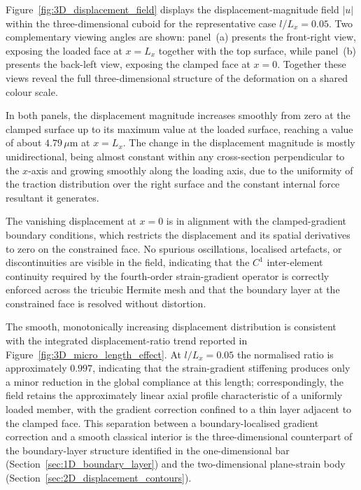 \documentclass[final,3p,times,fleqn]{elsarticle}
\begin{document}
Figure~\ref{fig:3D_displacement_field} displays the
displacement-magnitude field $|u|$ within the three-dimensional cuboid
for the representative case $l/L_{x}=0.05$.
Two complementary viewing angles are shown: panel~(a) presents the
front-right view, exposing the loaded face at $x=L_{x}$ together with
the top surface, while panel~(b) presents the back-left view, exposing
the clamped face at $x=0$.
Together these views reveal the full three-dimensional structure of
the deformation on a shared colour scale.


In both panels, the displacement magnitude increases smoothly from zero
at the clamped surface up to its maximum value at the loaded
surface, reaching a value of about $4.79\,\mu\mathrm{m}$ at $x=L_{x}$.
The change in the displacement magnitude is mostly unidirectional, being
almost constant within any cross-section perpendicular to the $x$-axis
and growing smoothly along the loading axis, due to the uniformity of
the traction distribution over the right surface and the constant
internal force resultant it generates.

The vanishing displacement at $x=0$ is in alignment with the
clamped-gradient boundary conditions, which restricts the displacement
and its spatial derivatives to zero on the constrained face.
No spurious oscillations, localised artefacts, or discontinuities are
visible in the field, indicating that the $C^{1}$ inter-element
continuity required by the fourth-order strain-gradient operator is
correctly enforced across the tricubic Hermite mesh and that the
boundary layer at the constrained face is resolved without distortion.


The smooth, monotonically increasing displacement distribution is
consistent with the integrated displacement-ratio trend reported in
Figure~\ref{fig:3D_micro_length_effect}.
At $l/L_{x}=0.05$ the normalised ratio is approximately $0.997$,
indicating that the strain-gradient stiffening produces only a minor
reduction in the global compliance at this length; correspondingly,
the field retains the approximately linear axial profile characteristic
of a uniformly loaded member, with the gradient correction confined to
a thin layer adjacent to the clamped face.
This separation between a boundary-localised gradient correction and a
smooth classical interior is the three-dimensional counterpart of the
boundary-layer structure identified in the one-dimensional bar
(Section~\ref{sec:1D_boundary_layer}) and the two-dimensional plane-strain body
(Section~\ref{sec:2D_displacement_contours}).
\end{document}

